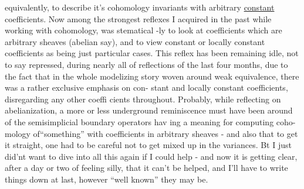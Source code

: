 
equivalently,  to describe it's cohomology invariants with 
 arbitrary \uline{constant}  coefficients.  Now among the strongest reflexes
I acquired in the past while working with cohomology,  was stematical%
-ly to look at coefficients which are arbitrary sheaves  (abelian say),
and to view  constant or locally constant coefficients as being just
particular cases.  This reflex has been remaining idle,  not to say
repressed,  during nearly all of  reflections of the last four
months,  due to the fact that in the whole modelizing story woven 
around weak equivalence, there was a rather exclusive emphasis on con-%
stant and locally constant coefficients,  disregarding any other coeffi%
cients throughout.  Probably,  while reflecting on abelianization,
a more or less underground reminiscence must have been around of the
semisimplicial boundary operators hav ing a meaning for computing coho-%
mology of``something''\hand{,} with coefficients in arbitrary sheaves  -  and
also that to get it straight,  one had to be careful not to get 
mixed up in the variances.  Bt I just did'nt want to dive into all 
this again if I could help -  and now it is getting clear,  after a
day or two of feeling silly,  that it can't be helped,  and I'll have
to write things down at last,  however ``well known'' they may be.


